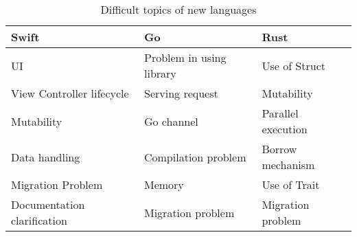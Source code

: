 \begin{table}[H]
\begin{tabular}{|l|l|l|}
\hline
Swift                                     & Go                                        & Rust                                      \\ \hline
UI                                        & Problem in using library                  & Use of Struct                             \\ \hline
View Controller lifecycle                 & Serving request                           & \cellcolor[HTML]{999903}Mutability        \\ \hline

\cellcolor[HTML]{999903}Mutability        & Go channel                                & Parallel execution                        \\ \hline
Data handling                             & Compilation problem                       & Borrow mechanism                          \\ \hline
\cellcolor[HTML]{4793A5}Migration Problem & Memory                                    & Use of Trait                              \\ \hline
Documentation clarification               & \cellcolor[HTML]{4793A5}Migration problem & \cellcolor[HTML]{4793A5}Migration problem \\ \hline
\end{tabular}
\caption{Difficult topics of new languages}
\label{table:language topics}
\end{table}